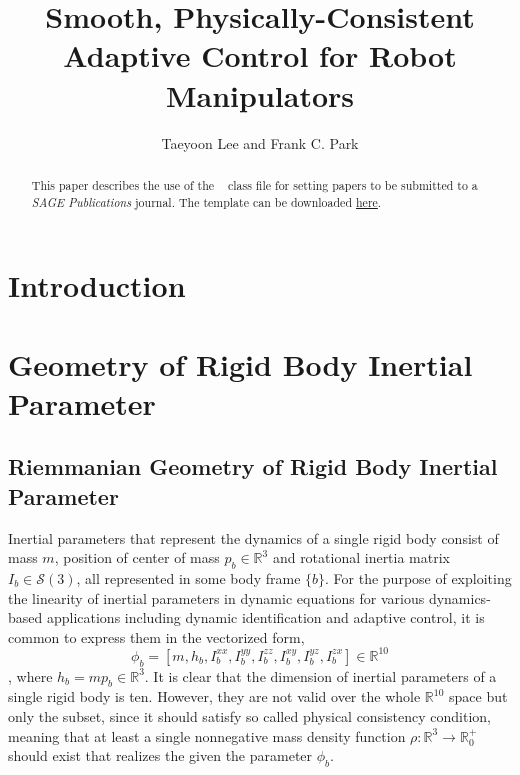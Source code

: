 \documentclass[Afour,sageh,times]{sagej}
\begin{document}

\title{Smooth, Physically-Consistent Adaptive Control for Robot Manipulators}

\author{Taeyoon Lee and Frank C. Park}




\begin{abstract}
This paper describes the use of the \LaTeXe\
\textsf{\journalclass} class file for setting papers to be
submitted to a \textit{SAGE Publications} journal.
The template can be downloaded \href{http://www.uk.sagepub.com/repository/binaries/SAGE LaTeX template.zip}{here}.
\end{abstract}


\maketitle
\section{Introduction}
\newpage
\section{Geometry of Rigid Body Inertial Parameter}
\subsection{Riemmanian Geometry of Rigid Body Inertial Parameter}
Inertial parameters that represent the dynamics of a single rigid body consist of mass $m$, position of center of mass $p_{b}\in\mathbb{R}^{3}$ and rotational inertia matrix $I_{b}\in\mathcal{S}(3)$, all represented in some body frame $\{b\}$. For the purpose of exploiting the linearity of inertial parameters in dynamic equations for various dynamics-based applications including dynamic identification and adaptive control, it is common to express them in the vectorized form,
\begin{equation*}
\phi_{b} = [m,h_{b},I_{b}^{xx},I_{b}^{yy},I_{b}^{zz},I_{b}^{xy},I_{b}^{yz},I_{b}^{zx}]\in\mathbb{R}^{10}
\end{equation*}
, where $h_{b} = mp_{b}\in \mathbb{R}^{3}$. It is clear that the dimension of inertial parameters of a single rigid body is ten. However, they are not valid over the whole $\mathbb{R}^{10}$ space but only the subset, since it should satisfy so called physical consistency condition, meaning that at least a single nonnegative mass density function $\rho : \mathbb{R}^{3} \rightarrow \mathbb{R}^{+}_{0}$ should exist that realizes the given the parameter $\phi_{b}$.
\end{document}
